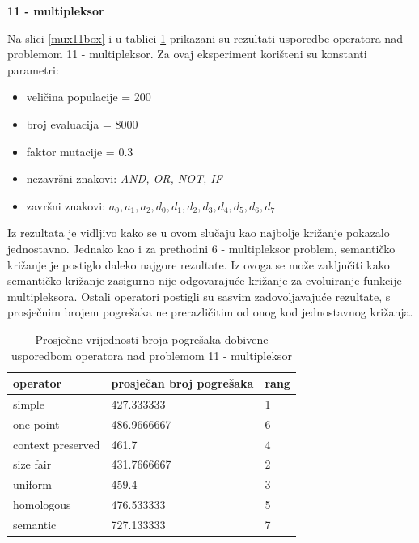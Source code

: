 \textbf{11 - multipleksor}

Na slici \ref{mux11box} i u tablici \ref{mux11table} prikazani su rezultati usporedbe operatora nad problemom 11 - multipleksor. Za ovaj eksperiment korišteni su konstanti parametri:
\begin{itemize}
\item{veličina populacije = 200}
\item{broj evaluacija = 8000}
\item{faktor mutacije = 0.3}
\item{nezavršni znakovi: \textit{AND, OR, NOT, IF}}
\item{završni znakovi: \textit{$a_0, a_1, a_2, d_0, d_1, d_2, d_3, d_4, d_5, d_6, d_7$}}
\end{itemize}

Iz rezultata je vidljivo kako se u ovom slučaju kao najbolje križanje pokazalo jednostavno. Jednako kao i za prethodni 6 - multipleksor problem, semantičko križanje je postiglo daleko najgore rezultate. Iz ovoga se može zaključiti kako semantičko križanje zasigurno nije odgovarajuće križanje za evoluiranje funkcije multipleksora. Ostali operatori postigli su sasvim zadovoljavajuće rezultate, s prosječnim brojem pogrešaka ne prerazličitim od onog kod jednostavnog križanja.

\begin{table}[H]
 	\centering

    \begin{tabular}{| l | l | l |}
    \hline
    \textbf{operator} & \textbf{prosječan broj pogrešaka} & \textbf{rang}\\ \hline
    simple & 427.333333 &1\\ \hline
    one point & 486.9666667 & 6\\ \hline
    context preserved & 461.7 & 4\\ \hline
    size fair & 431.7666667 & 2\\ \hline
    uniform & 459.4 & 3\\ \hline
    homologous & 476.533333 & 5\\ \hline
    semantic & 727.133333 & 7\\ \hline
    \end{tabular}
    
    \caption{Prosječne vrijednosti broja pogrešaka dobivene usporedbom operatora nad problemom 11 - multipleksor}
    \label{mux11table}
\end{table}

